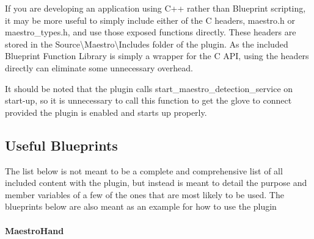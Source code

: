 If you are developing an application using C++ rather than Blueprint scripting, it may be more useful to simply include either of the C headers, {\ttfamily maestro.\+h} or {\ttfamily maestro\+\_\+types.\+h}, and use those exposed functions directly. These headers are stored in the {\ttfamily Source\textbackslash{}Maestro\textbackslash{}Includes} folder of the plugin. As the included Blueprint Function Library is simply a wrapper for the C A\+PI, using the headers directly can eliminate some unnecessary overhead.

It should be noted that the plugin calls {\ttfamily start\+\_\+maestro\+\_\+detection\+\_\+service} on start-\/up, so it is unnecessary to call this function to get the glove to connect provided the plugin is enabled and starts up properly.

\subsection*{Useful Blueprints}

The list below is not meant to be a complete and comprehensive list of all included content with the plugin, but instead is meant to detail the purpose and member variables of a few of the ones that are most likely to be used. The blueprints below are also meant as an example for how to use the plugin \paragraph*{Maestro\+Hand}

